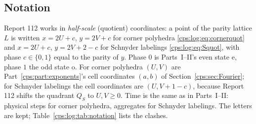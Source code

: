 \documentclass[11pt,letterpaper]{article}
\numberwithin{equation}{section}
\theoremstyle{remark}\newtheorem{remark}[theorem]{Remark}
\newcommand{\e}{\mathrm e}
\newcommand{\oState}{\mathrm o}
\begin{document}
\subsection{Notation}\label{cps:log:sec:notation}
Report 112 works in \emph{half-scale} (quotient) coordinates: a point of the parity lattice
$L$ is written $x=2U+c$, $y=2V+c$ for corner polyhedra \eqref{cps:log:eq:cornerquot} and
$x=2U+c$, $y=2V+2-c$ for Schnyder labelings \eqref{cps:log:eq:Squot}, with phase
$c\in\{0,1\}$ equal to the parity of $y$. Phase $0$ is Parts~I--II's even state $\e$, phase $1$
the odd state $\oState$. For corner polyhedra $(U,V)$ are Part~\ref{cps:part:exponents}'s cell
coordinates $(a,b)$ of Section~\ref{cps:sec:Fourier}; for Schnyder labelings the cell coordinates
are $(U,V+1-c)$, because Report 112 shifts the quadrant $Q_S$ to $U,V\ge0$. Time is the same as in Parts~I--II: physical steps for corner
polyhedra, aggregates for Schnyder labelings. The letters are kept; Table~\ref{cps:log:tab:notation}
lists the clashes.
\end{document}
